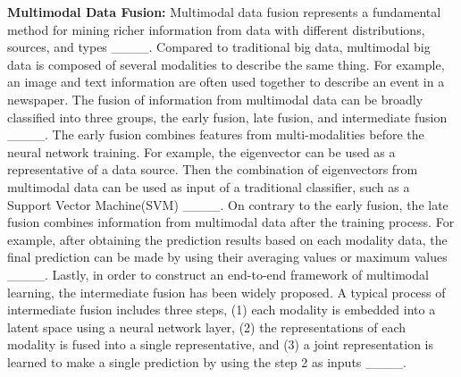 \textbf{Multimodal Data Fusion:} Multimodal data fusion represents a fundamental
method for mining richer information from data with different distributions,
sources, and types ____. Compared to traditional big
data, multimodal big data is composed of several modalities to describe the same
thing. For example, an image and text information are often used together to
describe an event in a newspaper. The fusion of information from multimodal data
can be broadly classified into three groups, the early fusion, late fusion, and
intermediate fusion ____. The early fusion combines features
from multi-modalities before the neural network training. For example, the
eigenvector can be used as a representative of a data source. Then the
combination of eigenvectors from multimodal data can be used as input of a
traditional classifier, such as a Support Vector Machine(SVM)
____. On contrary to the early fusion, the late fusion combines
information from multimodal data after the training process. For example, after
obtaining the prediction results based on each modality data, the final
prediction can be made by using their averaging values or maximum values
____. Lastly, in order to construct an end-to-end
framework of multimodal learning, the intermediate fusion has been widely
proposed. A typical process of intermediate fusion includes three steps, (1)
each modality is embedded into a latent space using a neural network layer, (2)
the representations of each modality is fused into a single representative, and
(3) a joint representation is learned to make a single prediction by using the
step 2 as inputs ____.